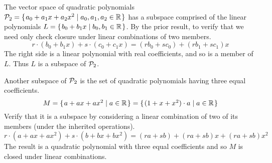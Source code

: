 \documentclass[10pt,t]{beamer}
\begin{document}
\begin{frame}
\ex
The vector space of quadratic polynomials
$\mathcal{P}_2=\mbox{$\{\hspace{0.1em}a_0+a_1x+a_2x^2\mid a_0,a_1,a_2\in\mathbb{R}\hspace{0.1em}\}$}$ has a subspace
comprised of the linear polynomials
$L=\mbox{$\{\hspace{0.1em}b_0+b_1x\mid b_0,b_1\in\mathbb{R}\hspace{0.1em}\}$}$.
By the prior result, to verify that we need only check 
closure under linear combinations of two members.
\begin{equation*}
  r\cdot(b_0+b_1x)+s\cdot(c_0+c_1x)=(rb_0+sc_0)+(rb_1+sc_1)x
\end{equation*}
The right side is a linear polynomial with real coefficients, and so is a 
member of $L$.
Thus $L$ is a subspace of $\mathcal{P}_2$.

\pause
\ex
Another subspace of $\mathcal{P}_2$ is the set of quadratic polynomials
having three equal coefficients.
\begin{equation*}
  M=\mbox{$\{\hspace{0.1em}a+ax+ax^2\mid a\in\mathbb{R}\hspace{0.1em}\}$}
   =\mbox{$\{\hspace{0.1em}(1+x+x^2)\cdot a\mid a\in\mathbb{R}\hspace{0.1em}\}$}
\end{equation*}
Verify that it is a subspace by
considering a linear combination of two of its members
(under the inherited operations).
\begin{equation*}
  r\cdot(a+ax+ax^2)+s\cdot(b+bx+bx^2)
  =(ra+sb)+(ra+sb)x+(ra+sb)x^2
\end{equation*}
The result is a quadratic polynomial with three equal coefficients  
and so $M$ is closed under linear combinations.
\end{frame}
\end{document}
